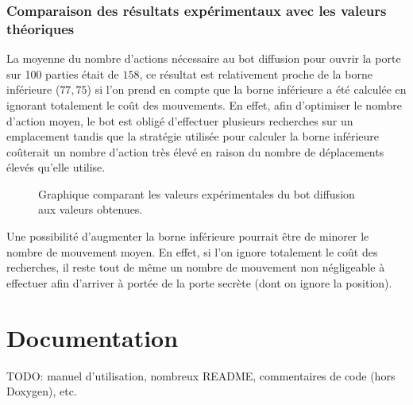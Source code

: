 \documentclass[a4paper,12pt]{article}
\begin{document}
\subsubsection{Comparaison des résultats expérimentaux avec les valeurs
  théoriques}
La moyenne du nombre d'actions nécessaire au bot diffusion pour ouvrir la porte
sur 100 parties était de $158$, ce résultat est relativement proche de la borne
inférieure ($77,75$) si l'on prend en compte que la borne inférieure a été
calculée en ignorant totalement le coût des mouvements. En effet, afin
d'optimiser le nombre d'action moyen, le bot est obligé d'effectuer plusieurs
recherches sur un emplacement tandis que la stratégie utilisée pour calculer la
borne inférieure coûterait un nombre d'action très élevé en raison du nombre de
déplacements élevés qu'elle utilise.
\begin{figure}[H]
	\caption{\label{fig:compare} Graphique comparant les valeurs expérimentales du
  bot diffusion aux valeurs obtenues.}
\end{figure}

Une possibilité d'augmenter la borne inférieure pourrait être de minorer le
nombre de mouvement moyen. En effet, si l'on ignore totalement le coût des
recherches, il reste tout de même un nombre de mouvement non négligeable à
effectuer afin d'arriver à portée de la porte secrète (dont on ignore la
position).

\section{Documentation}
TODO: manuel d'utilisation, nombreux README, commentaires de
code (hors Doxygen), etc.
\end{document}

